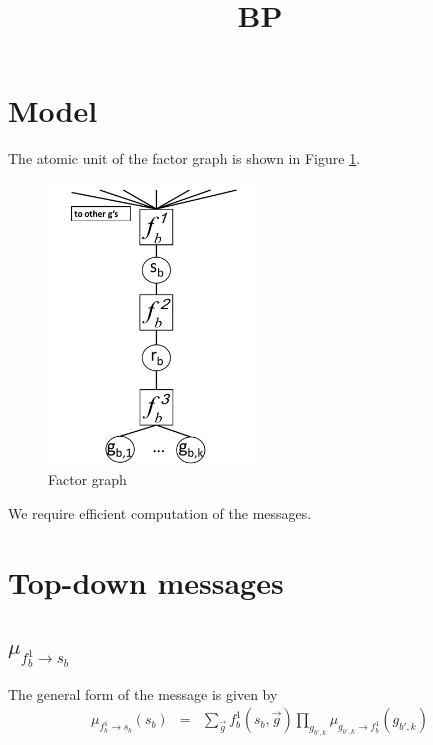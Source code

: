 \documentclass[11pt]{article}
\newcommand{\fb}[1]{f_b^{#1}}
\newcommand{\mFbSb}[1]{\mu_{ \fb{#1} \rightarrow s_{b}}}
\begin{document}
\title{BP}
\maketitle

\section{Model}

The atomic unit of the factor graph is shown in Figure \ref{bpModel}.

\begin{figure}[htbp]
\begin{center}
\includegraphics[width=0.5\textwidth]{bpModel.pdf}
\caption{Factor graph}
\label{bpModel}
\end{center}
\end{figure}

\FloatBarrier

We require efficient computation of the messages.

\section{Top-down messages}

\subsection{$\mFbSb1$}

The general form of the message is given by
\begin{eqnarray}
\mFbSb1(s_b) &=& \sum_{\vec{g}} \fb1(s_b, \vec{g}) \prod_{g_{b',k}} \mu_{g_{b',k} \rightarrow \fb1}(g_{b',k})
\end{eqnarray}
\end{document}
